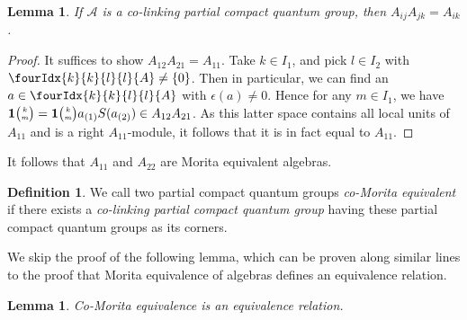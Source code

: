 \documentclass[10pt]{article}
\newcommand{\Grt}[3]{#1{\tiny {\begin{pmatrix} #2\\#3\end{pmatrix}}}}
\newcommand{\UnitC}[2]{\Grt{\mathbf{1}}{#1}{#2}}
\newcommand{\Gr}[5]{\fourIdx{#2}{#4}{#3}{#5}{#1}}%
\newtheorem{Lem}[Theorem]{Lemma}
\theoremstyle{definition}
\newtheorem{Def}[Theorem]{Definition}
\numberwithin{equation}{section}
\begin{document}
\begin{Lem}  If $\mathscr{A}$ is a co-linking partial compact quantum group, then  $A_{ij}A_{jk} = A_{ik}$.
\end{Lem}
\begin{proof} It suffices to show $A_{12}A_{21} = A_{11}$. Take $k\in I_1$, and pick $l\in I_2$ with $\Gr{A}{k}{l}{k}{l}\neq \{0\}$. Then in particular, we can find an $a\in \Gr{A}{k}{l}{k}{l}$ with $\epsilon(a)\neq 0$. Hence for any $m\in I_1$, we have $\UnitC{k}{m} = \UnitC{k}{m} a_{(1)}S(a_{(2)}) \in A_{12}A_{21}$. As this latter space contains all local units of $A_{11}$ and is a right $A_{11}$-module, it follows that it is in fact equal to $A_{11}$. 
\end{proof}

It follows that $A_{11}$ and $A_{22}$ are Morita equivalent algebras.

\begin{Def} We call two partial compact quantum groups \emph{co-Morita equivalent} if there exists a \emph{co-linking partial compact quantum group} having these partial compact quantum groups as its corners.
\end{Def}

We skip the proof of the following lemma, which can be proven along similar lines to the proof that Morita equivalence of algebras defines an equivalence relation.

\begin{Lem} Co-Morita equivalence is an equivalence relation. 
\end{Lem} 
\end{document}
